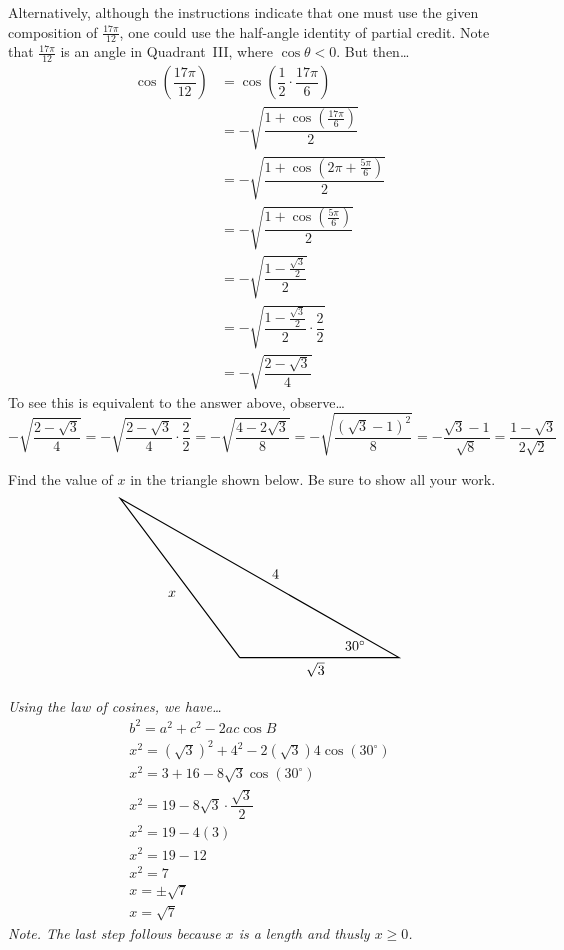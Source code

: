 \documentclass[12pt,letterpaper]{exam}
\begin{document}
\begin{questions}
{{\footnotesize Alternatively, although the instructions indicate that one must use the given composition of $\frac{17\pi}{12}$, one could use the half-angle identity of partial credit. Note that $\frac{17\pi}{12}$ is an angle in Quadrant~III, where $\cos \theta < 0$. But then\dots
	\[
	\begin{aligned}
	\cos \left( \dfrac{17\pi}{12} \right)&= \cos \left(\dfrac{1}{2} \cdot \dfrac{17\pi}{6} \right) \\
	&= -\sqrt{\dfrac{1 + \cos \left( \frac{17\pi}{6} \right)}{2}} \\
	&= -\sqrt{\dfrac{1 + \cos \left(2\pi + \frac{5\pi}{6} \right)}{2}} \\
	&= -\sqrt{\dfrac{1 + \cos \left(\frac{5\pi}{6} \right)}{2}} \\
	&= -\sqrt{\dfrac{1 - \frac{\sqrt{3}}{2}}{2}} \\
	&= -\sqrt{\dfrac{1 - \frac{\sqrt{3}}{2}}{2} \cdot \dfrac{2}{2}} \\
	&= -\sqrt{\dfrac{2 - \sqrt{3}}{4}}
	\end{aligned}
	\]
To see this is equivalent to the answer above, observe\dots
	\[
	-\sqrt{\dfrac{2 - \sqrt{3}}{4}}= -\sqrt{\dfrac{2 - \sqrt{3}}{4} \cdot \dfrac{2}{2}}= -\sqrt{\dfrac{4 - 2\sqrt{3}}{8}}= -\sqrt{\dfrac{(\sqrt{3} - 1)^2}{8}}= - \dfrac{\sqrt{3} - 1}{\sqrt{8}}= \dfrac{1 - \sqrt{3}}{2 \sqrt{2}}
	\]
     }
}



\newpage
\question[15] Find the value of $x$ in the triangle shown below. Be sure to show all your work.
	\[
	\begin{tikzpicture}
	\draw[line width=0.03cm] (0,0) -- (-3,4) -- (4,0) -- (0,0);
	\node at (-1.7,1.6) {$x$};
	\node at (1.9,-0.3) {$\sqrt{3}$};
	\node at (0.9,2.1) {$4$};
	\node at (2.9,0.3) {$30^\circ$};
	\end{tikzpicture}
	\] \pspace

{\itshape \tsol Using the law of cosines, we have\dots
	\[
	\begin{gathered}
	b^2= a^2 + c^2 - 2ac \cos B \\[0.3cm]
	x^2= (\sqrt{3})^2 + 4^2 - 2(\sqrt{3}) 4 \cos(30^\circ) \\[0.3cm]
	x^2= 3 + 16 - 8 \sqrt{3} \cos(30^\circ) \\[0.3cm]
	x^2= 19 - 8 \sqrt{3} \cdot \dfrac{\sqrt{3}}{2} \\[0.3cm] 
	x^2= 19 - 4(3) \\[0.3cm]
	x^2= 19 - 12 \\[0.3cm]
	x^2= 7 \\[0.3cm]
	x= \pm \sqrt{7} \\[0.3cm]
	x= \sqrt{7}
	\end{gathered}
	\]
Note. The last step follows because $x$ is a length and thusly $x \geq 0$.
}




\end{questions}
\end{document}
